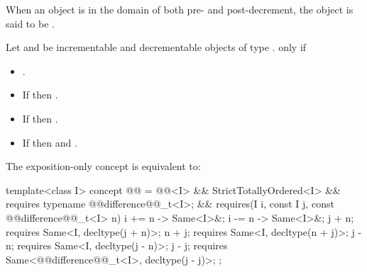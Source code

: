 \begin{itemdescr}
\pnum
When an object is in the domain of both pre- and post-decrement,
the object is said to be .

\pnum
Let  and  be incrementable and decrementable objects of type
. 
  only if
\begin{itemize}
\item {}.
\item If  then .
\item If  then .
\item If  then  and
.
\end{itemize}
\end{itemdescr}

\pnum
The exposition-only  concept is equivalent to:
\begin{itemdecl}
template<class I>
concept @@ =
  @@<I> && StrictTotallyOrdered<I> &&
  requires { typename @@difference@@_t<I>; } &&
  requires(I i, const I j, const @@difference@@_t<I> n) {
    { i += n } -> Same<I>&;
    { i -= n } -> Same<I>&;
    j + n; requires Same<I, decltype(j + n)>;
    n + j; requires Same<I, decltype(n + j)>;
    j - n; requires Same<I, decltype(j - n)>;
    j - j; requires Same<@@difference@@_t<I>, decltype(j - j)>;
  };
\end{itemdecl}


